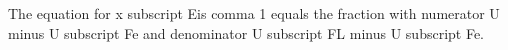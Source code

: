 The equation for x subscript Eis comma 1 equals the fraction with numerator U minus U subscript Fe and denominator U subscript FL minus U subscript Fe.
